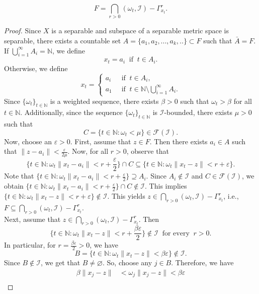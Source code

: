 \documentclass[reqno]{amsart}
\begin{document}
{\begin{theorem}
$$
F=\bigcap_{r>0}(\omega_t,\mathcal{I})-\Gamma_{x_t}^r.
$$
\end{theorem}
\begin{proof}
Since $X$ is a separable and subspace of a separable metric space is separable, there exists a countable set $A=\{a_1,a_2,...,a_k,..\}\subset F$ such that $\bar{A}=F$.  If $\bigcup_{i=1}^{\infty}A_i=\mathbb{N}$, we define
$$
x_{t}=
a_i ~\mbox{ if }~t\in A_i.
$$
Otherwise, we define
$$x_t=
\begin{cases}
	a_i &~\mbox{ if }~t\in A_i,\\
	a_1 &~ \mbox{ if }~t\in\mathbb{N}\setminus \bigcup_{i=1}^{\infty}A_i.
\end{cases}$$
Since $\{\omega_t\}_{t\in\mathbb{N}}$ is a weighted sequence, there exists $\beta>0$ such that $\omega_t>\beta$ for all $t\in\mathbb{N}$. Additionally, since the sequence $\{\omega_t\}_{t\in\mathbb{N}}$ is $\mathcal{I}$-bounded, there exists  $\mu > 0$ 
such that 
$$
C=\{t\in\mathbb{N}:\omega_t<\mu\}\in \mathcal{F}(\mathcal{I}).
$$  
Now, choose an $\varepsilon>0$.
First, assume that $z\in F$. Then there exists $a_i\in A$ such that $\|z-a_i\|<\frac{\varepsilon}{2\mu}$. Now, for all $r>0$, observe that 
$$
\{t\in\mathbb{N}:\omega_t\|x_t-a_i\|<r+\frac{\varepsilon}{2}\}\cap C\subseteq \{t\in\mathbb{N}:\omega_t\|x_t-z\|<r+\varepsilon\}.
$$
Note that $\{t\in\mathbb{N}:\omega_t\|x_t-a_i\|<r+\frac{\varepsilon}{2}\}\supseteq A_i$. Since $A_i\notin\mathcal{I}$ and $C\in \mathcal{F}(\mathcal{I})$,
we obtain $\{t\in\mathbb{N}:\omega_t\|x_t-a_i\|<r+\frac{\varepsilon}{2}\}\cap C\notin\mathcal{I}$. This implies $\{t\in\mathbb{N}:\omega_t\|x_t-z\|<r+\varepsilon\}\notin \mathcal{I}$. This yields $z\in \displaystyle\bigcap_{r>0}(\omega_t,\mathcal{I})-\Gamma_{x_t}^r$, i.e., $F\subseteq \displaystyle\bigcap_{r>0}(\omega_t,\mathcal{I})-\Gamma_{x_t}^r$.\\
Next, assume that $z\in \displaystyle\bigcap_{r>0}(\omega_t,\mathcal{I})-\Gamma_{x_t}^r$. 
 Then 
$$
\{t\in\mathbb{N}:\omega_t\|x_t-z\|<r+\frac{\beta\varepsilon}{2}\}\notin\mathcal{I}~\mbox{ for every }~r>0.
$$
In particular, for $r=\frac{\beta\varepsilon}{2}>0$, we have 
$$
B=\{t\in\mathbb{N}:\omega_t\|x_t-z\|<\beta\varepsilon\}\notin\mathcal{I}.
$$
Since $B\notin\mathcal{I}$, we get that $B\neq\varnothing$. So, choose any $j\in B$. Therefore, we have 
\begin{align*}
	\beta\|x_j-z\|&<\omega_j\|x_j-z\|<\beta\varepsilon\\

\end{align*}
\end{proof}}
\end{document}
